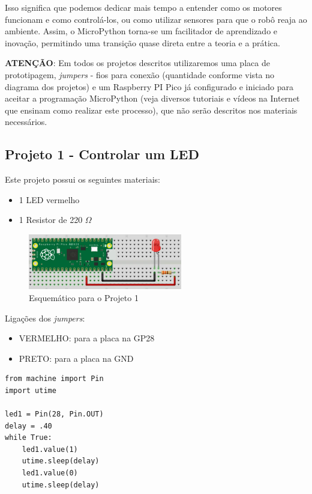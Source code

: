 \documentclass[a4paper,11pt]{article}
\begin{document}
Isso significa que podemos dedicar mais tempo a entender como os motores funcionam e como controlá-los, ou como utilizar sensores para que o robô reaja ao ambiente. Assim, o MicroPython torna-se um facilitador de aprendizado e inovação, permitindo uma transição quase direta entre a teoria e a prática.

\textbf{ATENÇÃO}: Em todos os projetos descritos utilizaremos uma placa de prototipagem, \textit{jumpers} - fios para conexão (quantidade conforme vista no diagrama dos projetos) e um Raspberry PI Pico já configurado e iniciado para aceitar a programação MicroPython (veja diversos tutoriais e vídeos na Internet que ensinam como realizar este processo), que não serão descritos nos materiais necessários.

\subsection{Projeto 1 - Controlar um LED}

Este projeto possui os seguintes materiais: \vspace{-1em}
\begin{itemize}
	\item 1 LED vermelho
	\item 1 Resistor de 220 $\Omega$
\end{itemize}

\begin{figure}[H]
	\centering
	\includegraphics[width=0.6\textwidth]{imagem/PicoProj1}
	\caption{Esquemático para o Projeto 1}
\end{figure}

Ligações dos \textit{jumpers}: \vspace{-1em}
\begin{itemize}
	\item VERMELHO: para a placa na GP28
	\item PRETO: para a placa na GND
\end{itemize}

\begin{lstlisting}
from machine import Pin
import utime

led1 = Pin(28, Pin.OUT)
delay = .40
while True:
	led1.value(1)
	utime.sleep(delay)
	led1.value(0)
	utime.sleep(delay)
\end{lstlisting}
\end{document}
